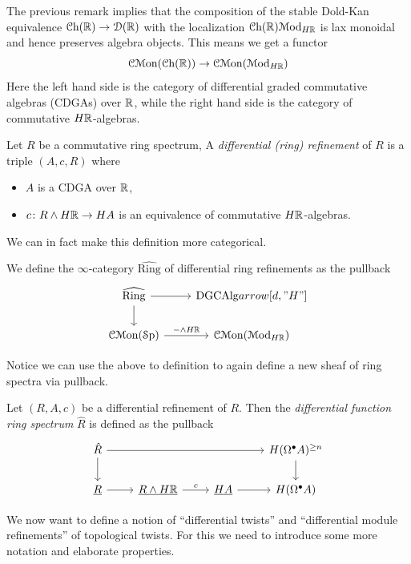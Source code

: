 \documentclass[10pt]{amsart}
\begin{document}
The previous remark implies that the composition of the stable Dold-Kan equivalence $\mathcal{C}\mathrm{h}(\mathbb{R}) \to \mathcal{D}(\mathbb{R})$ with the localization $\mathcal{C}\mathrm{h}(\mathbb{R}) \mathcal{M}\mathrm{od}_{H\mathbb{R}}$ is lax monoidal and hence preserves algebra objects. This means we get a functor
\[\mathcal{C}\mathcal{M}\mathrm{on}(\mathcal{C}\mathrm{h}(\mathbb{R})) \to \mathcal{C}\mathcal{M}\mathrm{on}(\mathcal{M}\mathrm{od}_{H\mathbb{R}}) \]
Here the left hand side is the category of differential graded commutative algebras (CDGAs) over $\mathbb{R}$, while the right hand side is the category of commutative $H\mathbb{R}$-algebras.

\begin{definition}
  Let $R$ be a commutative ring spectrum, A \emph{differential (ring) refinement} of $R$ is a triple $(A, c, R)$ where
  \begin{itemize}
    \item $A$ is a CDGA over $\mathbb{R}$,
    \item $c\colon R \wedge H\mathbb{R} \to HA$ is an equivalence of commutative $H\mathbb{R}$-algebras.
  \end{itemize}
\end{definition}

We can in fact make this definition more categorical.

\begin{definition}
  We define the $\infty$-category $\widehat{\mathrm{Ring}}$ of differential ring refinements as the pullback
  \[
  \begin{tikzcd}
    \widehat{\mathrm{Ring}} \arrow[r] \arrow[d] & \mathrm{DGCAlg} arrow[d, "H"] \\
    \CMon(\Sp) \arrow[r, " - \wedge H\bR"] & \CMon(\Mod_{H\bR})
  \end{tikzcd}
  \]
\end{definition}

Notice we can use the above to definition to again define a new sheaf of ring spectra via pullback.

\begin{definition}
  Let $(R,A,c)$ be a differential refinement of $R$. Then the \emph{differential function ring spectrum} $\hat{R}$ is defined as the pullback
  \[
  \begin{tikzcd}
    \hat{R} \arrow[d] \arrow[rrr] & & & H(\Omega^\bullet A)^{\geq n} \arrow[d] \\ 
    \underline{R} \arrow[r] & \underline{R \wedge H\bR} \arrow[r, "c"] & \underline{HA} \arrow[r] & H(\Omega^\bullet A)
  \end{tikzcd}
  \]
\end{definition}

We now want to define a notion of ``differential twists'' and ``differential module refinements'' of topological twists. For this we need to introduce some more notation and elaborate properties.
\end{document}
